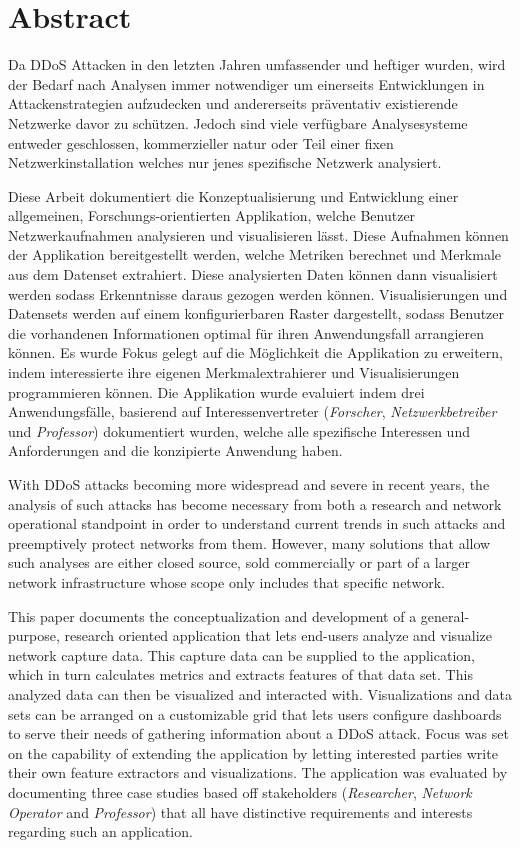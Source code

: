 \chapter*{Abstract}

Da DDoS Attacken in den letzten Jahren umfassender und heftiger wurden, wird der Bedarf nach Analysen immer notwendiger um einerseits Entwicklungen in Attackenstrategien aufzudecken und andererseits präventativ existierende Netzwerke davor zu schützen. Jedoch sind viele verfügbare Analysesysteme entweder geschlossen, kommerzieller natur oder Teil einer fixen Netzwerkinstallation welches nur jenes spezifische Netzwerk analysiert.

Diese Arbeit dokumentiert die Konzeptualisierung und Entwicklung einer allgemeinen, Forschungs-orientierten Applikation, welche Benutzer Netzwerkaufnahmen analysieren und visualisieren lässt. Diese Aufnahmen können der Applikation bereitgestellt werden, welche Metriken berechnet und Merkmale aus dem Datenset extrahiert. Diese analysierten Daten können dann visualisiert werden sodass Erkenntnisse daraus gezogen werden können. Visualisierungen und Datensets werden auf einem konfigurierbaren Raster dargestellt, sodass Benutzer die vorhandenen Informationen optimal für ihren Anwendungsfall arrangieren können. Es wurde Fokus gelegt auf die Möglichkeit die Applikation zu erweitern, indem interessierte ihre eigenen Merkmalextrahierer und Visualisierungen programmieren können. Die Applikation wurde evaluiert indem drei Anwendungsfälle, basierend auf Interessenvertreter (\emph{Forscher}, \emph{Netzwerkbetreiber} und \emph{Professor}) dokumentiert wurden, welche alle spezifische Interessen und Anforderungen and die konzipierte Anwendung haben.





With DDoS attacks becoming more widespread and severe in recent years, the analysis of such attacks has become necessary from both a research and network operational standpoint in order to understand current trends in such attacks and preemptively protect networks from them. However, many solutions that allow such analyses are either closed source, sold commercially or part of a larger network infrastructure whose scope only includes that specific network. 

This paper documents the conceptualization and development of a general-purpose, research oriented application that lets end-users analyze and visualize network capture data. This capture data can be supplied to the application, which in turn calculates metrics and extracts features of that data set. This analyzed data can then be visualized and interacted with. Visualizations and data sets can be arranged on a customizable grid that lets users configure dashboards to serve their needs of gathering information about a DDoS attack. Focus was set on the capability of extending the application by letting interested parties write their own feature extractors and visualizations. The application was evaluated by documenting three case studies based off stakeholders (\emph{Researcher}, \emph{Network Operator} and \emph{Professor}) that all have distinctive requirements and interests regarding such an application.